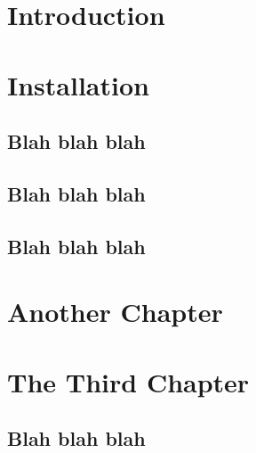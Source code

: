 

\renewcommand{\doctitleB}[0]{用户手册}
\renewcommand{\tpVersion}[0]{版本}
\renewcommand{\tpCopyright}[0]{版权所有 {\copyright} 2021 AOSC 社群集体创作}
\renewcommand{\tpLicense}[1]{使用 #1 许可证发布}


    \makecoverpage
    \setcounter{tocdepth}{1}
    \sffamily{\tableofcontents}
    \clearpage
    \pagestyle{plain}
    \rmfamily\mdseries\normalsize

    \chapter{Introduction}

    \lipsum[1]

    \lipsum[1]



    \chapter{Installation}
    \lipsum[1]
    
    \section{Blah blah blah}
    \lipsum[1]
    
    \section{Blah blah blah}
    \lipsum[1]
    
    \section{Blah blah blah}
    \lipsum[1]



    \chapter{Another Chapter}
    \lipsum[1]
    
    \lipsum[1]



    \chapter{The Third Chapter}
    \lipsum[1]
    
    \section{Blah blah blah}
    \lipsum[1]
    
